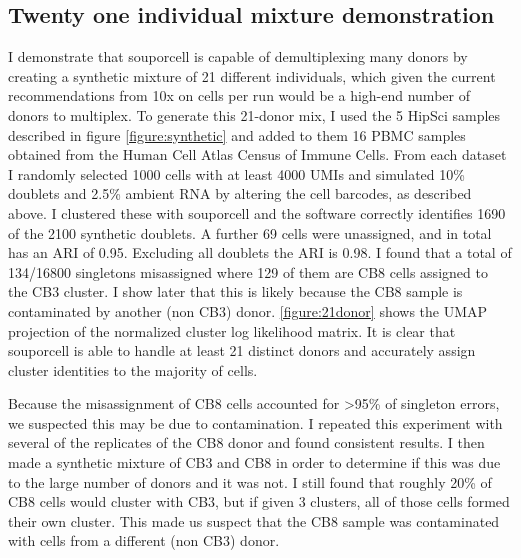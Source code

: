 \subsection{Twenty one individual mixture demonstration}
\par{
I demonstrate that souporcell is capable of demultiplexing many donors by creating a synthetic mixture
of 21 different individuals, which given the current recommendations from 10x on cells per run would be
a high-end number of donors to multiplex. To generate this 21-donor mix, I used the 5 HipSci samples
described in figure \ref{figure:synthetic} and added to them 16 PBMC samples obtained from the Human Cell Atlas Census of
Immune Cells. From each dataset I randomly selected 1000 cells with at least 4000 UMIs and
simulated 10\% doublets and 2.5\% ambient RNA by altering the cell barcodes, as described above. I
clustered these with souporcell and the software correctly identifies 1690 of the 2100 synthetic doublets.
A further 69 cells were unassigned, and in total has an ARI of 0.95. Excluding all doublets the ARI
is 0.98. I found that a total of 134/16800 singletons misassigned where 129 of them are CB8 cells assigned to
the CB3 cluster. I show later that this is likely because the CB8 sample is contaminated by another
(non CB3) donor. \ref{figure:21donor} shows the UMAP projection of the normalized cluster log likelihood
matrix. It is clear that souporcell is able to handle at least 21 distinct donors and accurately assign cluster
identities to the majority of cells. 
} 

\par{
Because the misassignment of CB8 cells accounted for >95\% of singleton errors, we suspected this may be due to
contamination. I repeated this experiment with several of the replicates of the CB8 donor and found
consistent results. I then made a synthetic mixture of CB3 and CB8 in order to determine if this was
due to the large number of donors and it was not. I still found that roughly 20\% of CB8 cells would
cluster with CB3, but if given 3 clusters, all of those cells formed their own cluster. This made us suspect 
that the CB8 sample was contaminated with cells from a different (non CB3) donor.
}


